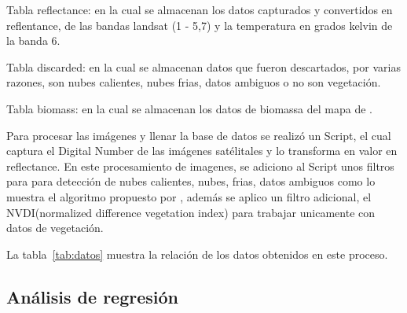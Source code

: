 Tabla reflectance: en la cual se almacenan los datos capturados y convertidos en reflentance,
de las bandas landsat (1 - 5,7) y la temperatura en grados kelvin de la banda 6.

Tabla discarded: en la cual se almacenan datos que fueron descartados, por varias razones,
son nubes calientes, nubes frias, datos ambiguos o no son vegetación.

Tabla biomass: en la cual se almacenan los datos de biomassa del mapa de \cite{baccini2008afirst}.

Para procesar las imágenes y llenar la base de datos se realizó un Script, el cual captura el Digital Number
de las imágenes satélitales y lo transforma en valor en reflectance. En este procesamiento de imagenes, se adiciono al Script unos filtros para para detección de nubes calientes,
nubes, frias, datos ambiguos como lo muestra el algoritmo propuesto por \cite{irish2000landsat}, además se aplico 
un filtro adicional, el NVDI(normalized difference vegetation index) para trabajar unicamente con datos de vegetación.

La tabla~\ref{tab:datos} muestra la relación de los datos obtenidos en este proceso.

\begin{table}
\caption{Datos obtenidos en en el proceso de procesamiento y limpieza  de datos}
\label{tab:datos}
\centering
{}
\end{table}

\subsection{Análisis de regresión}

